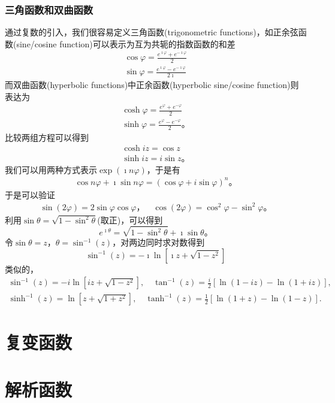 \subsubsection{三角函数和双曲函数}
通过复数的引入，我们很容易定义三角函数(trigonometric functions)，如正余弦函数(sine/cosine function)可以表示为互为共轭的指数函数的和差
\begin{align}
    \cos \varphi = \frac{e^{\imath \varphi} + e^{ -\imath \varphi} }{2}
    \\
    \sin \varphi = \frac{e^{\imath \varphi} - e^{ -\imath \varphi} }{2\imath}
\end{align}
而双曲函数(hyperbolic functions)中正余函数(hyperbolic sine/cosine function)则表达为
\begin{align}
    \cosh \varphi = \frac{e^{\varphi} + e^{ - \varphi} }{2}
    \\
    \sinh \varphi = \frac{e^{\varphi} - e^{ - \varphi} }{2} \textrm{。}
\end{align}
比较两组方程可以得到
\begin{align}
    \cosh iz = \cos z
    \\
    \sinh iz = i \sin z\textrm{。}
\end{align}
我们可以用两种方式表示$\exp(\imath n \varphi)$，于是有
\begin{align}
    \cos n \varphi + \imath \sin n\varphi = (\cos \varphi + i \sin \varphi)^n  \textrm{。}
\end{align}
于是可以验证
\begin{align}
    \sin(2\varphi) = 2\sin\varphi \cos\varphi\textrm{，} \quad \cos (2\varphi) = \cos^2\varphi - \sin^2\varphi \textrm{。}
\end{align}
利用$\sin \theta = \sqrt{1 - \sin ^2 \theta }$(取正)，可以得到
\begin{equation}
  e^{\imath \theta} = \sqrt{ 1 - \sin ^2 \theta } + \imath \sin \theta \textrm{。}  
\end{equation} 
令$\sin \theta = z$，$\theta = \sin^{-1} (z)$，对两边同时求对数得到
\begin{equation}
    \sin^{-1} (z) = -\imath \ln \left[ \imath z + \sqrt{1-z^2} \right]
\end{equation}
类似的，
\begin{equation}
    \begin{array}{cc}
    \sin ^{-1}(z)=-i \ln \left[i z+\sqrt{1-z^2}\right], \quad \tan ^{-1}(z)=\frac{i}{2}[\ln (1-i z)-\ln (1+i z)], \\
    \sinh ^{-1}(z)=\ln \left[z+\sqrt{1+z^2}\right], \quad \tanh ^{-1}(z)=\frac{1}{2}[\ln (1+z)-\ln (1-z)] .
    \end{array}
\end{equation}

\subsubsection{}
\section{复变函数}
\begin{figure}
    \centering

    

\end{figure}
\section{解析函数}



